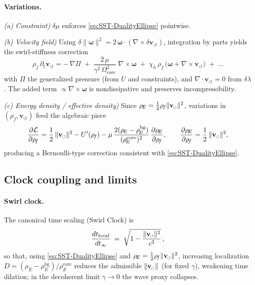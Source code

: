 \documentclass[10pt,reprint,aps,onecolumn,nofootinbib]{revtex4-2}
\newcommand{\vswirl}{\mathbf{v}_{\!\boldsymbol{\circlearrowleft}}}
\newcommand{\vnorm}{\lVert \mathbf{v}_{\mkern-2mu\scriptscriptstyle\boldsymbol{\circlearrowleft}} \rVert}               %
\newcommand{\rhoF}{\rho_{\!f}}
\newcommand{\rhoE}{\rho_{\!E}}                           %
\newcommand{\omegaVec}{\boldsymbol{\omega}}
\newcommand{\OmegaCore}{\Omega_{\mathrm{core}}}
\newcommand{\bg}{\mathrm{bg}}
\newcommand{\core}{\mathrm{core}}
\begin{document}
\paragraph{Variations.}
    \emph{(a) Constraint)} $\delta\mu$ enforces \eqref{eq:SST-DualityEllipse} pointwise.

    \noindent\emph{(b) Velocity field)}
    Using $\delta\lVert\omegaVec\rVert^{2}=2\,\omegaVec\!\cdot\!(\nabla\times\delta\vswirl)$,
    integration by parts yields the swirl-stiffness correction
    \begin{equation}
        \rhoF\,\partial_t\vswirl
        = -\,\nabla\Pi \;+\; \frac{2\,\mu}{\gamma^{2}\,\OmegaCore^{2}}\;\nabla\times\omegaVec
        \;+\;\chi_h\,\rhoF\,\big(\omegaVec+\nabla\times\vswirl\big)
        \;+\;\ldots
        \label{eq:EL-velocity}
    \end{equation}
    with $\Pi$ the generalized pressure (from $U$ and constraints), and $\nabla\!\cdot\!\vswirl=0$ from $\delta\lambda$.
    The added term $\propto\nabla\times\omegaVec$ is nondissipative and preserves incompressibility.

    \noindent\emph{(c) Energy density / effective density)}
    Since $\rhoE=\tfrac12\rhoF\vnorm^2$, variations in $(\rhoF,\vswirl)$ feed the algebraic piece
    \begin{equation}
        \frac{\partial \mathcal L}{\partial \rhoF}
        = \frac12\,\vnorm^2 - U'(\rhoF)
        - \mu\,\frac{2(\rhoE-\rhoE^{\bg})}{(\rhoE^{\core})^{2}}\,\frac{\partial \rhoE}{\partial \rhoF},
        \qquad
        \frac{\partial \rhoE}{\partial \rhoF}=\frac12\,\vnorm^2,
    \end{equation}
    producing a Bernoulli-type correction consistent with \eqref{eq:SST-DualityEllipse}.

\subsection{Clock coupling and limits}
\label{subsec:Clock-Limits}

\paragraph{Swirl clock.}
    The canonical time scaling (Swirl Clock) is
    \begin{equation}
        \frac{dt_{\text{local}}}{dt_{\infty}}
        \;=\;\sqrt{1-\frac{\vnorm^{2}}{c^{2}}}\,,
    \end{equation}
    so that, using \eqref{eq:SST-DualityEllipse} and $\rhoE=\tfrac12\rhoF\vnorm^2$,
    increasing localization $D=(\rhoE-\rhoE^{\bg})/\rhoE^{\core}$ reduces the admissible $\vnorm$
    (for fixed $\gamma$), weakening time dilation; in the decoherent limit $\gamma\to0$ the wave proxy collapses.
\end{document}
